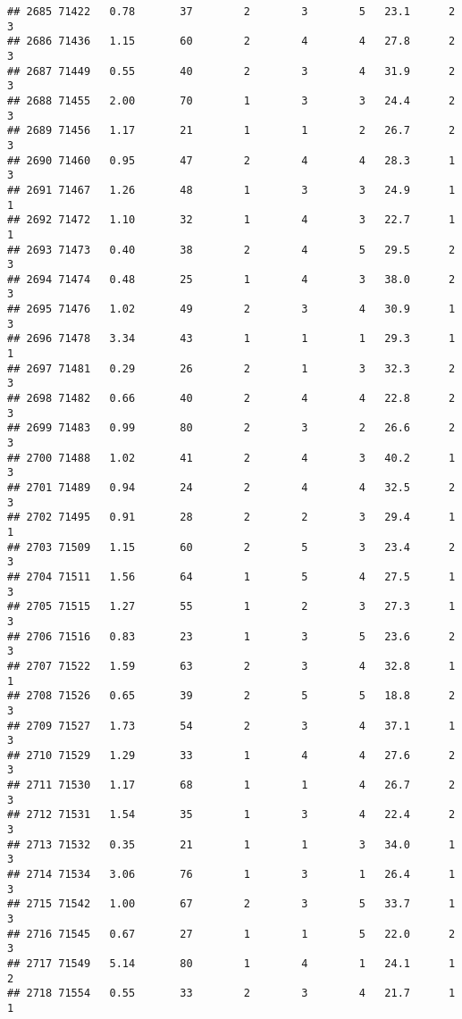 \documentclass[
]{article}
\begin{document}
\begin{verbatim}
## 2685 71422   0.78       37        2        3        5   23.1      2      3
## 2686 71436   1.15       60        2        4        4   27.8      2      3
## 2687 71449   0.55       40        2        3        4   31.9      2      3
## 2688 71455   2.00       70        1        3        3   24.4      2      3
## 2689 71456   1.17       21        1        1        2   26.7      2      3
## 2690 71460   0.95       47        2        4        4   28.3      1      3
## 2691 71467   1.26       48        1        3        3   24.9      1      1
## 2692 71472   1.10       32        1        4        3   22.7      1      1
## 2693 71473   0.40       38        2        4        5   29.5      2      3
## 2694 71474   0.48       25        1        4        3   38.0      2      3
## 2695 71476   1.02       49        2        3        4   30.9      1      3
## 2696 71478   3.34       43        1        1        1   29.3      1      1
## 2697 71481   0.29       26        2        1        3   32.3      2      3
## 2698 71482   0.66       40        2        4        4   22.8      2      3
## 2699 71483   0.99       80        2        3        2   26.6      2      3
## 2700 71488   1.02       41        2        4        3   40.2      1      3
## 2701 71489   0.94       24        2        4        4   32.5      2      3
## 2702 71495   0.91       28        2        2        3   29.4      1      1
## 2703 71509   1.15       60        2        5        3   23.4      2      3
## 2704 71511   1.56       64        1        5        4   27.5      1      3
## 2705 71515   1.27       55        1        2        3   27.3      1      3
## 2706 71516   0.83       23        1        3        5   23.6      2      3
## 2707 71522   1.59       63        2        3        4   32.8      1      1
## 2708 71526   0.65       39        2        5        5   18.8      2      3
## 2709 71527   1.73       54        2        3        4   37.1      1      3
## 2710 71529   1.29       33        1        4        4   27.6      2      3
## 2711 71530   1.17       68        1        1        4   26.7      2      3
## 2712 71531   1.54       35        1        3        4   22.4      2      3
## 2713 71532   0.35       21        1        1        3   34.0      1      3
## 2714 71534   3.06       76        1        3        1   26.4      1      3
## 2715 71542   1.00       67        2        3        5   33.7      1      3
## 2716 71545   0.67       27        1        1        5   22.0      2      3
## 2717 71549   5.14       80        1        4        1   24.1      1      2
## 2718 71554   0.55       33        2        3        4   21.7      1      1

\end{verbatim}
\end{document}

